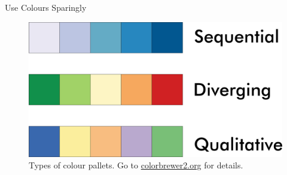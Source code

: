 \documentclass[
  ignorenonframetext,
]{beamer}
\begin{document}
\begin{frame}{Use Colours Sparingly}
\protect\hypertarget{use-colours-sparingly}{}
\begin{figure}
\centering
\includegraphics{../manuscript/resources/06_visualisation/ColorBrewer.png}
\caption{Types of colour pallets. Go to \url{colorbrewer2.org} for
details.}
\end{figure}
\end{frame}
\end{document}
